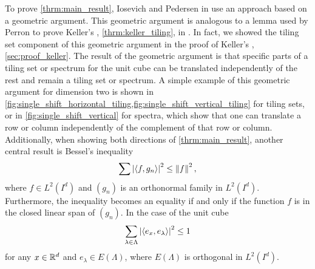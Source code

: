 \documentclass[../thesis.tex]{subfiles}
\begin{document}
To prove \cref{thrm:main_result}, Iosevich and Pedersen in \cite{iosevichSpectralTilingProperties1998} use an approach based on a geometric argument. This geometric argument is analogous to a lemma used by Perron to prove Keller's , \cref{thrm:keller_tiling}, in \cite{perronUeberLueckenloseAusfuellung1940}. In fact, we showed the tiling set component of this geometric argument in the proof of Keller's , \cref{sec:proof_keller}. The result of the geometric argument is that specific parts of a tiling set or spectrum for the unit cube can be translated independently of the rest and remain a tiling set or spectrum. A simple example of this geometric argument for dimension two is shown in \cref{fig:single_shift_horizontal_tiling,fig:single_shift_vertical_tiling} for tiling sets, or in \cref{fig:single_shift_vertical} for spectra, which show that one can translate a row or column independently of the complement of that row or column. Additionally, when showing both directions of \cref{thrm:main_result}, another central result is Bessel's inequality
\begin{equation*}%
    \sum\bralMed{\braaMed{f,g_n}}^2 \leq \branMed{f}^2,
\end{equation*}
where $f\in L^2(I^d)$ and $(g_n)$ is an orthonormal family in $L^2(I^d)$. Furthermore, the inequality becomes an equality if and only if the function $f$ is in the closed linear span of $(g_n)$. In the case of the unit cube
\begin{equation*}
    \sum_{\lambda \in \Lambda} \left|\left \langle e_x,e_\lambda \right \rangle\right|^2 \leq 1
\end{equation*}
for any $x\in \mathbb{R}^d$ and $e_\lambda\in E(\Lambda)$, where $E(\Lambda)$ is orthogonal in $L^2(I^d)$.
\end{document}
